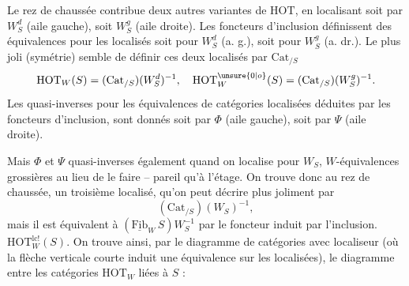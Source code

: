 Le rez de chaussée contribue deux autres variantes
de $\mathrm{HOT}$, en localisant soit par $W_S^d$ (aile gauche),
soit  $W_S^g$ (aile droite). Les foncteurs d'inclusion
définissent des équivalences pour les localisés soit
pour $W_S^d$ (a. g.), soit pour $W_S^g$ (a. dr.). Le
plus joli (symétrie) semble de définir ces deux
localisés par $\mathrm{Cat}_{/S}$
\[
\mathrm{HOT}_W(S)=(\mathrm{Cat}_{/S})(W_S^d)^{-1},\quad
\mathrm{HOT}_W^{\unsure{0|o}}(S)=(\mathrm{Cat}_{/S})(W_S^g)^{-1}.
\]
Les quasi-inverses pour les équivalences de catégories
localisées déduites par les foncteurs d'inclusion,
sont donnés soit par $\Phi$ (aile gauche), soit par $\Psi$
(aile droite). 

Mais $\Phi$ et $\Psi$  quasi-inverses également quand on localise pour $W_S$,
 $W$-équivalences grossières au lieu de le faire
-- pareil qu'à l'étage. On trouve donc au rez
de chaussée, un  troisième localisé, qu'on peut
décrire  plus joliment par
\[
(\mathrm{Cat}_{/S})(W_S)^{-1},
\]
mais il est équivalent à $(\underline{\mathrm{Fib}}_W\,S)W_S^{-1}$ par le
foncteur induit par l'inclusion. 
$\mathrm{HOT}_W^{\mathrm{lc}!}(S)$. On trouve ainsi, par le diagramme
 de catégories avec localiseur
(où la flèche verticale courte induit une équivalence sur les localisées), le diagramme 
entre les catégories $\mathrm{HOT}_W$ liées à $S$ :

